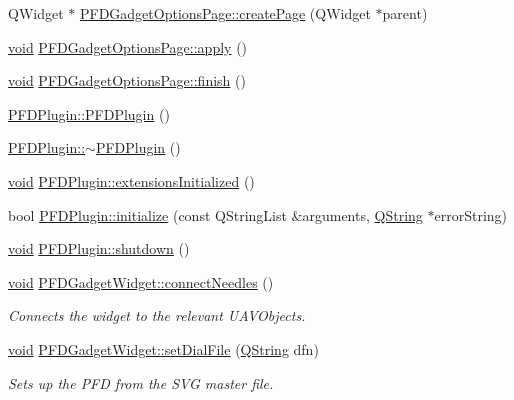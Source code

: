 \begin{DoxyCompactItemize}
\item 
\-Q\-Widget $\ast$ \hyperlink{group___p_f_d_plugin_gafa8be3bab1132cd2079a9610e594aa77}{\-P\-F\-D\-Gadget\-Options\-Page\-::create\-Page} (\-Q\-Widget $\ast$parent)
\item 
\hyperlink{group___u_a_v_objects_plugin_ga444cf2ff3f0ecbe028adce838d373f5c}{void} \hyperlink{group___p_f_d_plugin_gafd1965bb221fe257dbf056b8441b15aa}{\-P\-F\-D\-Gadget\-Options\-Page\-::apply} ()
\item 
\hyperlink{group___u_a_v_objects_plugin_ga444cf2ff3f0ecbe028adce838d373f5c}{void} \hyperlink{group___p_f_d_plugin_ga1edd62ccbcef9e6090a5b9061c5af34f}{\-P\-F\-D\-Gadget\-Options\-Page\-::finish} ()
\item 
\hyperlink{group___p_f_d_plugin_gaae905eda9a2b7787c1c4bde899b1d9ad}{\-P\-F\-D\-Plugin\-::\-P\-F\-D\-Plugin} ()
\item 
\hyperlink{group___p_f_d_plugin_ga87aa31c062c14f56bd9ef0cc4f656d89}{\-P\-F\-D\-Plugin\-::$\sim$\-P\-F\-D\-Plugin} ()
\item 
\hyperlink{group___u_a_v_objects_plugin_ga444cf2ff3f0ecbe028adce838d373f5c}{void} \hyperlink{group___p_f_d_plugin_ga4db36e2e23e4ade00fcf37bf863c4232}{\-P\-F\-D\-Plugin\-::extensions\-Initialized} ()
\item 
bool \hyperlink{group___p_f_d_plugin_ga9494fd7b5f521ffd086c63287ad01a18}{\-P\-F\-D\-Plugin\-::initialize} (const \-Q\-String\-List \&arguments, \hyperlink{group___u_a_v_objects_plugin_gab9d252f49c333c94a72f97ce3105a32d}{\-Q\-String} $\ast$error\-String)
\item 
\hyperlink{group___u_a_v_objects_plugin_ga444cf2ff3f0ecbe028adce838d373f5c}{void} \hyperlink{group___p_f_d_plugin_ga378193e80b5473898ab8a75bbfe0d4bb}{\-P\-F\-D\-Plugin\-::shutdown} ()
\item 
\hyperlink{group___u_a_v_objects_plugin_ga444cf2ff3f0ecbe028adce838d373f5c}{void} \hyperlink{group___p_f_d_plugin_ga0fa94b6084a622184f38a1ef0d259792}{\-P\-F\-D\-Gadget\-Widget\-::connect\-Needles} ()
\begin{DoxyCompactList}\small\item\em \-Connects the widget to the relevant \-U\-A\-V\-Objects. \end{DoxyCompactList}\item 
\hyperlink{group___u_a_v_objects_plugin_ga444cf2ff3f0ecbe028adce838d373f5c}{void} \hyperlink{group___p_f_d_plugin_ga2de7c848eacd359fc56a4c2a8c2b6aaf}{\-P\-F\-D\-Gadget\-Widget\-::set\-Dial\-File} (\hyperlink{group___u_a_v_objects_plugin_gab9d252f49c333c94a72f97ce3105a32d}{\-Q\-String} dfn)
\begin{DoxyCompactList}\small\item\em \-Sets up the \-P\-F\-D from the \-S\-V\-G master file. \end{DoxyCompactList}\end{DoxyCompactItemize}
